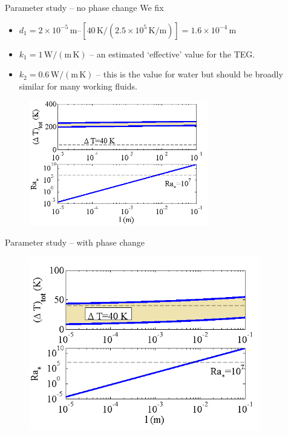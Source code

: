 \documentclass[10pt,mathserif]{beamer}
\begin{document}
\begin{frame}{Parameter study -- no phase change}
%
We fix
\begin{itemize}
\item $d_1=2\times 10^{-5}\,\mathrm{m}$--$\left[40\,\mathrm{K}/(2.5\times 10^5\,\mathrm{K/m})\right]=1.6\times 10^{-4}\,\mathrm{m}$
\item $k_1=1\,\mathrm{W/(m\,K)}$ -- an estimated `effective' value for the TEG.
\item $k_2=0.6\,\mathrm{W/(m\,K)}$ -- this is the value for water but should be broadly similar for many working fluids.
\end{itemize}
%
\vspace{-0.08in}
\begin{figure}
	\centering
		\includegraphics[width=0.7\textwidth]{size_L_singlephase}
	\label{fig:size_L_singlephase}
\end{figure}
\end{frame}


\begin{frame}{Parameter study -- with phase change}
\begin{figure}
	\centering
		\includegraphics[width=0.9\textwidth]{size_L_twophase}
	\label{fig:size_L_singlephase}
\end{figure}
\end{frame}
\end{document}
